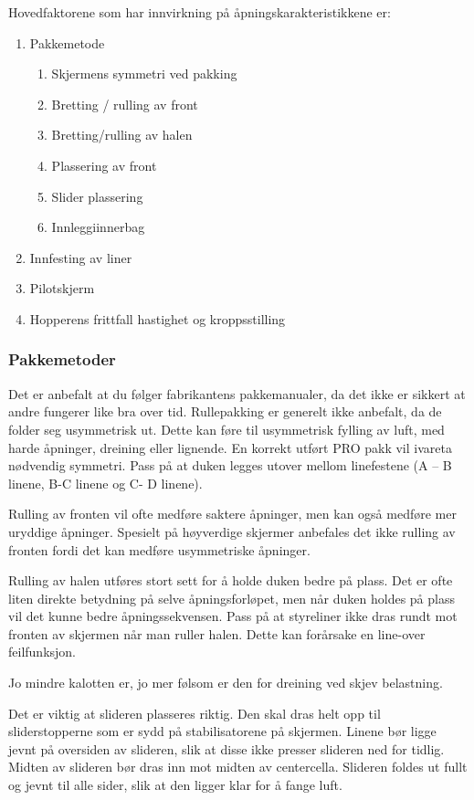 Hovedfaktorene som har innvirkning på åpningskarakteristikkene er:
\begin{enumerate}
	\item Pakkemetode
	\begin{enumerate}
		\item Skjermens symmetri ved pakking
		\item Bretting / rulling av front
		\item Bretting/rulling av halen
		\item Plassering av front
		\item Slider plassering
		\item Innleggiinnerbag
	\end{enumerate}
	\item Innfesting av liner
	\item Pilotskjerm
	\item Hopperens frittfall hastighet og kroppsstilling
\end{enumerate}

\subsubsection{Pakkemetoder}
Det er anbefalt at du følger fabrikantens pakkemanualer, da det ikke er sikkert at andre fungerer like bra over tid. Rullepakking er generelt ikke anbefalt, da de folder seg usymmetrisk ut. Dette kan føre til usymmetrisk fylling av luft, med harde åpninger, dreining eller lignende. En korrekt utført PRO pakk vil ivareta nødvendig symmetri. Pass på at duken legges utover mellom linefestene (A – B linene, B-C linene og C- D linene).

Rulling av fronten vil ofte medføre saktere åpninger, men kan også medføre mer uryddige åpninger. Spesielt på høyverdige skjermer anbefales det ikke rulling av fronten fordi det kan medføre usymmetriske åpninger.

Rulling av halen utføres stort sett for å holde duken bedre på plass. Det er ofte liten direkte betydning på selve åpningsforløpet, men når duken holdes på plass vil det kunne bedre åpningssekvensen. Pass på at styreliner ikke dras rundt mot fronten av skjermen når man ruller halen. Dette kan forårsake en line-over feilfunksjon.

Jo mindre kalotten er, jo mer følsom er den for dreining ved skjev belastning.

Det er viktig at slideren plasseres riktig. Den skal dras helt opp til sliderstopperne som er sydd på stabilisatorene på skjermen. Linene bør ligge jevnt på oversiden av slideren, slik at disse ikke presser slideren ned for tidlig. Midten av slideren bør dras inn mot midten av centercella. Slideren foldes ut fullt og jevnt til alle sider, slik at den ligger klar for å fange luft.

